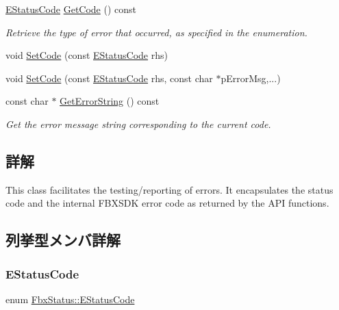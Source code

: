 \begin{DoxyCompactItemize}
\hyperlink{class_fbx_status_a6a631d5d95b28e31a19aabd5f5809ecc}{E\+Status\+Code} \hyperlink{class_fbx_status_a342ecfe81651d2c99785cac9592a41dc}{Get\+Code} () const
\begin{DoxyCompactList}\small\item\em Retrieve the type of error that occurred, as specified in the enumeration. \end{DoxyCompactList}\item 
void \hyperlink{class_fbx_status_a906fe62e4753eb13571c359daf07cbf3}{Set\+Code} (const \hyperlink{class_fbx_status_a6a631d5d95b28e31a19aabd5f5809ecc}{E\+Status\+Code} rhs)
\item 
void \hyperlink{class_fbx_status_a6991ae689fa0c9f5f72449f531772deb}{Set\+Code} (const \hyperlink{class_fbx_status_a6a631d5d95b28e31a19aabd5f5809ecc}{E\+Status\+Code} rhs, const char $\ast$p\+Error\+Msg,...)
\item 
const char $\ast$ \hyperlink{class_fbx_status_aa36b462a6c63105538c483518415fb66}{Get\+Error\+String} () const
\begin{DoxyCompactList}\small\item\em Get the error message string corresponding to the current code. \end{DoxyCompactList}\end{DoxyCompactItemize}


\subsection{詳解}
This class facilitates the testing/reporting of errors. It encapsulates the status code and the internal F\+B\+X\+S\+DK error code as returned by the A\+PI functions. 

\subsection{列挙型メンバ詳解}
\mbox{\label{class_fbx_status_a6a631d5d95b28e31a19aabd5f5809ecc}} 
\subsubsection{\texorpdfstring{E\+Status\+Code}{EStatusCode}}
{\footnotesize\ttfamily enum \hyperlink{class_fbx_status_a6a631d5d95b28e31a19aabd5f5809ecc}{Fbx\+Status\+::\+E\+Status\+Code}}



